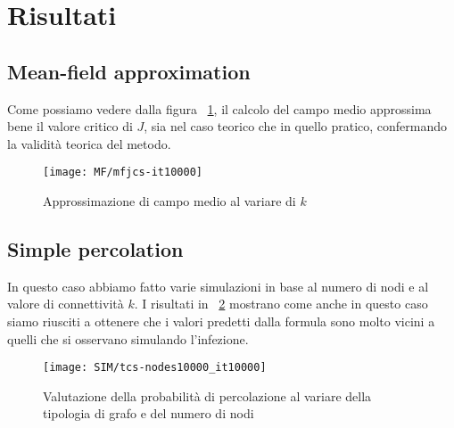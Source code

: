 \section{Risultati}\label{sec:risultati}

\subsection{Mean-field approximation}\label{subsec:res-mean-field-approximation}
    Come possiamo vedere dalla figura ~\ref{fig:mf_critical_j}, il calcolo del campo medio approssima bene il valore
    critico di $J$, sia nel caso teorico che in quello pratico, confermando la validità teorica del metodo.

    \begin{figure}[H]
        \texttt{[image: MF/mfjcs-it10000]}\caption{Approssimazione di campo medio al variare di $k$}
        \label{fig:mf_critical_j}
    \end{figure}

\subsection{Simple percolation}\label{subsec:res-simple-percolation}
    In questo caso abbiamo fatto varie simulazioni in base al numero di nodi e al valore di connettività $k$.
    I risultati in ~\ref{fig:prob_percolation_n10000} mostrano come anche in questo caso siamo riusciti a ottenere che
    i valori predetti dalla formula sono molto vicini a quelli che si osservano simulando l'infezione.

    \begin{figure}[H]
        \texttt{[image: SIM/tcs-nodes10000\_it10000]}
        \caption{Valutazione della probabilità di percolazione al variare della tipologia di grafo e del numero di nodi}
        \label{fig:prob_percolation_n10000}
    \end{figure}

